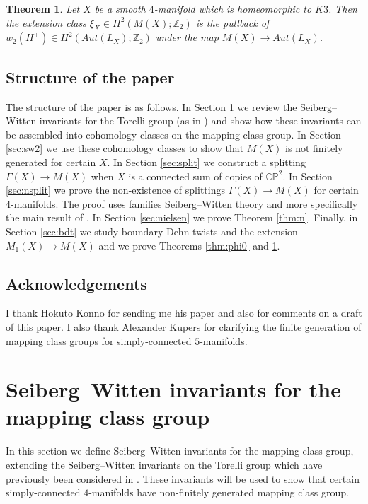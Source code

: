 \documentclass{amsart}
\newtheorem{theorem}{Theorem}[section]
\theoremstyle{definition}
\theoremstyle{remark}
\numberwithin{equation}{section}
\begin{document}
\begin{theorem}\label{thm:pull}
Let $X$ be a smooth $4$-manifold which is homeomorphic to $K3$. Then the extension class $\xi_X \in H^2( M(X) ; \mathbb{Z}_2)$ is the pullback of $w_2(H^+) \in H^2( Aut(L_X) ; \mathbb{Z}_2 )$ under the map $M(X) \to Aut(L_X)$.
\end{theorem}

\subsection{Structure of the paper}

The structure of the paper is as follows. In Section \ref{sec:sw1} we review the Seiberg--Witten invariants for the Torelli group (as in \cite{rub1,rub2,bk1}) and show how these invariants can be assembled into cohomology classes on the mapping class group. In Section \ref{sec:sw2} we use these cohomology classes to show that $M(X)$ is not finitely generated for certain $X$. In Section \ref{sec:split} we construct a splitting $\Gamma(X) \to M(X)$ when $X$ is a connected sum of copies of $\mathbb{CP}^2$. In Section \ref{sec:nsplit} we prove the non-existence of splittings $\Gamma(X) \to M(X)$ for certain $4$-manifolds. The proof uses families Seiberg--Witten theory and more specifically the main result of \cite{bar1}. In Section \ref{sec:nielsen} we prove Theorem \ref{thm:n}. Finally, in Section \ref{sec:bdt} we study boundary Dehn twists and the extension $M_1(X) \to M(X)$ and we prove Theorems \ref{thm:phi0} and \ref{thm:pull}.


\subsection{Acknowledgements}

I thank Hokuto Konno for sending me his paper \cite{kon} and also for comments on a draft of this paper. I also thank Alexander Kupers for clarifying the finite generation of mapping class groups for simply-connected $5$-manifolds.


\section{Seiberg--Witten invariants for the mapping class group}\label{sec:sw1}

In this section we define Seiberg--Witten invariants for the mapping class group, extending the Seiberg--Witten invariants on the Torelli group which have previously been considered in \cite{rub1,rub2,bk1}. These invariants will be used to show that certain simply-connected $4$-manifolds have non-finitely generated mapping class group.
\end{document}
